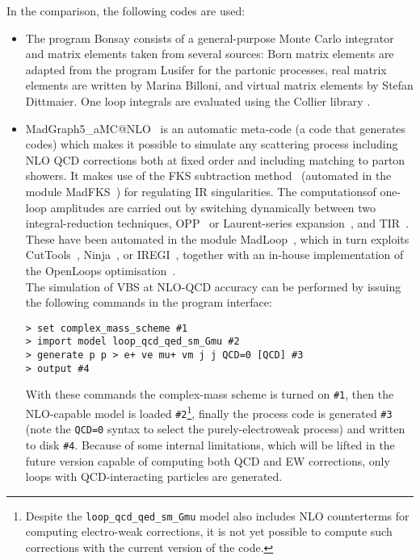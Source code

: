 In the comparison, the following codes are used: 
\begin{itemize}
 \item The program {\sc Bonsay} consists of a general-purpose Monte Carlo integrator
and matrix elements taken from several sources: Born matrix elements are
adapted from the program {\sc Lusifer} \cite{Dittmaier:2002ap} for the partonic
processes, real matrix elements are written by Marina Billoni, and virtual
matrix elements by Stefan Dittmaier.
One loop integrals are evaluated using the {\sc Collier} library
\cite{Denner:2014gla,Denner:2016kdg}.

  \item {\sc MadGraph5\_aMC@NLO}~\cite{Alwall:2014hca} is an automatic meta-code (a code that generates codes) which makes it possible to simulate any scattering process
      including NLO QCD corrections both at fixed order and including matching to parton showers. It makes use of the FKS subtraction method~\cite{Frixione:1995ms,
        Frixione:1997np} (automated in the module {\sc MadFKS}~\cite{Frederix:2009yq,
        Frederix:2016rdc}) for regulating IR singularities. The computationsof one-loop amplitudes are carried out by switching dynamically between 
        two integral-reduction techniques, OPP~\cite{Ossola:2006us} or Laurent-series expansion~\cite{Mastrolia:2012bu},
        and TIR~\cite{Passarino:1978jh,Davydychev:1991va,Denner:2005nn}. These have been automated in the module {\sc MadLoop}~\cite{Hirschi:2011pa}, which 
        in turn exploits {\sc CutTools}~\cite{Ossola:2007ax}, {\sc Ninja}~\cite{Peraro:2014cba,
        Hirschi:2016mdz}, or {\sc IREGI}~\cite{ShaoIREGI}, together with an in-house implementation of the {\sc OpenLoops} optimisation~\cite{Cascioli:2011va}.\\
        The simulation of VBS at NLO-QCD accuracy can be performed by issuing the following commands in the program interface:
\begin{verbatim}
> set complex_mass_scheme #1
> import model loop_qcd_qed_sm_Gmu #2
> generate p p > e+ ve mu+ vm j j QCD=0 [QCD] #3
> output #4
\end{verbatim}
  With these commands the complex-mass scheme is turned on {\tt \#1}, then the NLO-capable model is loaded {\tt \#2}\footnote{Despite
            the {\tt loop\_qcd\_qed\_sm\_Gmu} model also includes NLO counterterms for computing electro-weak corrections, it is not yet possible to compute such corrections 
        with the current version of the code.}, finally the process code is generated {\tt \#3} (note the {\tt QCD=0} syntax to select the purely-electroweak process)
        and written to disk {\tt \#4}. Because of some internal limitations, which will be lifted in the future version capable of computing both QCD and EW corrections, 
        only loops with QCD-interacting particles are generated.
        

\end{itemize}
